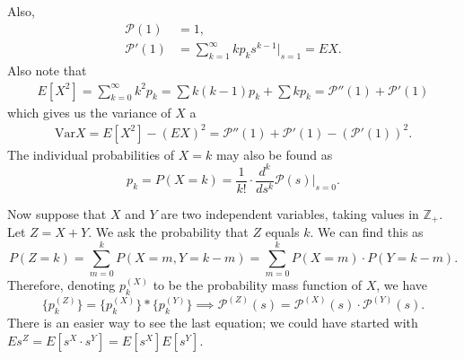 \documentclass[15pt,a4paper]{book}
\theoremstyle{definition}
\newcommand{\Z}{\mathbb{Z}}
\newcommand{\cP}{\mathcal{P}}
\newcommand{\Var}{\text{Var}}
\begin{document}
Also,
\begin{align}
    \cP (1) &= 1,\\
    \cP'(1) &= \sum_{k=1}^{\infty} kp_{k} s^{k-1} |_{s=1} = EX.
\end{align}
Also note that
\begin{align}
    E[X^{2}] = \sum_{k=0}^{\infty} k^{2} p_{k} = \sum k(k-1) p_{k} + \sum k p_{k} = \cP''(1) + \cP'(1)
\end{align}
which gives us the variance of $X$ a
\begin{align}
    \Var X = E[X^{2}] - (EX)^{2} = \cP ''(1) + \cP'(1) - (\cP '(1))^{2}.
\end{align}
The individual probabilities of $X=k$ may also be found as
\begin{equation}
    p_{k} = P(X=k) = \frac{1}{k!} \cdot \frac{d^{k}}{ds^{k}} \cP (s) |_{s=0}.
\end{equation}

Now suppose that $X$ and $Y$ are two independent variables, taking values in $\Z_{+}$. Let $Z = X+Y$. We ask the probability that $Z$ equals $k$. We can find this as
\begin{equation}
    P(Z = k) = \sum_{m=0}^{k} P(X=m, Y = k-m) = \sum_{m=0}^{k} P(X = m) \cdot P(Y = k-m).
\end{equation}
Therefore, denoting $p_{k}^{(X)}$ to be the probability mass function of $X$, we have
\begin{equation}
    \{p_{k}^{(Z)}\} = \{p_{k}^{(X)}\} \ast \{p_{k}^{(Y)}\} \implies \cP^{(Z)}(s) = \cP^{(X)} (s) \cdot \cP^{(Y)} (s).
\end{equation}
There is an easier way to see the last equation; we could have started with $Es^{Z} = E[s^{X} \cdot s^{Y}] = E[s^{X}] E[s^{Y}]$.\\
\end{document}
